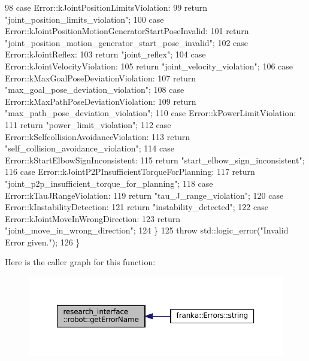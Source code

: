 \begin{DoxyCode}
98     \textcolor{keywordflow}{case} Error::kJointPositionLimitsViolation:
99       \textcolor{keywordflow}{return} \textcolor{stringliteral}{"joint\_position\_limits\_violation"};
100     \textcolor{keywordflow}{case} Error::kJointPositionMotionGeneratorStartPoseInvalid:
101       \textcolor{keywordflow}{return} \textcolor{stringliteral}{"joint\_position\_motion\_generator\_start\_pose\_invalid"};
102     \textcolor{keywordflow}{case} Error::kJointReflex:
103       \textcolor{keywordflow}{return} \textcolor{stringliteral}{"joint\_reflex"};
104     \textcolor{keywordflow}{case} Error::kJointVelocityViolation:
105       \textcolor{keywordflow}{return} \textcolor{stringliteral}{"joint\_velocity\_violation"};
106     \textcolor{keywordflow}{case} Error::kMaxGoalPoseDeviationViolation:
107       \textcolor{keywordflow}{return} \textcolor{stringliteral}{"max\_goal\_pose\_deviation\_violation"};
108     \textcolor{keywordflow}{case} Error::kMaxPathPoseDeviationViolation:
109       \textcolor{keywordflow}{return} \textcolor{stringliteral}{"max\_path\_pose\_deviation\_violation"};
110     \textcolor{keywordflow}{case} Error::kPowerLimitViolation:
111       \textcolor{keywordflow}{return} \textcolor{stringliteral}{"power\_limit\_violation"};
112     \textcolor{keywordflow}{case} Error::kSelfcollisionAvoidanceViolation:
113       \textcolor{keywordflow}{return} \textcolor{stringliteral}{"self\_collision\_avoidance\_violation"};
114     \textcolor{keywordflow}{case} Error::kStartElbowSignInconsistent:
115       \textcolor{keywordflow}{return} \textcolor{stringliteral}{"start\_elbow\_sign\_inconsistent"};
116     \textcolor{keywordflow}{case} Error::kJointP2PInsufficientTorqueForPlanning:
117       \textcolor{keywordflow}{return} \textcolor{stringliteral}{"joint\_p2p\_insufficient\_torque\_for\_planning"};
118     \textcolor{keywordflow}{case} Error::kTauJRangeViolation:
119       \textcolor{keywordflow}{return} \textcolor{stringliteral}{"tau\_J\_range\_violation"};
120     \textcolor{keywordflow}{case} Error::kInstabilityDetection:
121       \textcolor{keywordflow}{return} \textcolor{stringliteral}{"instability\_detected"};
122     \textcolor{keywordflow}{case} Error::kJointMoveInWrongDirection:
123       \textcolor{keywordflow}{return} \textcolor{stringliteral}{"joint\_move\_in\_wrong\_direction"};
124   \}
125   \textcolor{keywordflow}{throw} std::logic\_error(\textcolor{stringliteral}{"Invalid Error given."});
126 \}
\end{DoxyCode}
Here is the caller graph for this function\+:
\nopagebreak
\begin{figure}[H]
\begin{center}
\leavevmode
\includegraphics[width=350pt]{namespaceresearch__interface_1_1robot_a95920f2181aaff8df4949bc7d9036a2f_icgraph}
\end{center}
\end{figure}


